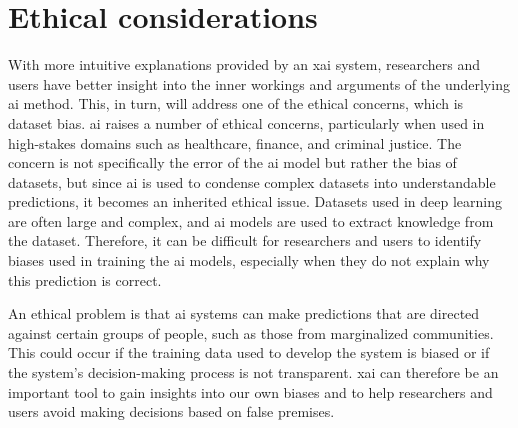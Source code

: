 \label{sec:1_5_ethical_considerations}

\begin{comment}
Ethical considerations in research are a set of principles that guide your research designs and practices. Scientists and researchers must always adhere to a certain code of conduct when collecting data from people. For example, the goals of human research often include understanding real-life phenomena, studying effective treatments, investigating behaviors, and improving lives in other ways. What you decide to research and how you conduct that research involve key ethical considerations such as:

i) protect the rights of research participants (privacy); 
ii) enhance research validity, 
iii) maintain scientific integrity; etc. Thus include here a short description of an assessment of any relevant potential ethical considerations.
\end{comment}

\section{Ethical considerations}


With more intuitive explanations provided by an \gls{xai} system, researchers and users have better insight into the inner workings and arguments of the underlying \gls{ai} method. This, in turn, will address one of the ethical concerns, which is dataset bias. \gls{ai} raises a number of ethical concerns, particularly when used in high-stakes domains such as healthcare, finance, and criminal justice. The concern is not specifically the error of the \gls{ai} model but rather the bias of datasets, but since \gls{ai} is used to condense complex datasets into understandable predictions, it becomes an inherited ethical issue. 
Datasets used in deep learning are often large and complex, and \gls{ai} models are used to extract knowledge from the dataset. Therefore, it can be difficult for researchers and users to identify biases used in training the \gls{ai} models, especially when they do not explain why this prediction is correct. 


An ethical problem is that \gls{ai} systems can make predictions that are directed against certain groups of people, such as those from marginalized communities. This could occur if the training data used to develop the system is biased or if the system's decision-making process is not transparent. \gls{xai} can therefore be an important tool to gain insights into our own biases and to help researchers and users avoid making decisions based on false premises. 


